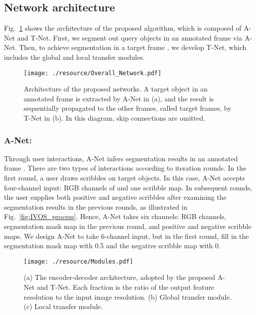 \documentclass[runningheads]{llncs}
\begin{document}
\subsection{Network architecture} \label{subsec:Network}

Fig.~\ref{fig:OverallNetwork} shows the architecture of the proposed algorithm, which is composed of A-Net and T-Net. First, we segment out query objects in an annotated frame  via A-Net. Then, to achieve segmentation in a target frame , we develop T-Net, which includes the global and local transfer modules.

\begin{figure}[t]
\centering
    \texttt{[image: ./resource/Overall\_Network.pdf]}
\caption{Architecture of the proposed networks. A target object in an annotated frame  is extracted by A-Net in (a), and the result is sequentially propagated to the other frames, called target frames, by T-Net in (b). In this diagram, skip connections are omitted.}
\label{fig:OverallNetwork}
\end{figure}

\subsubsection{A-Net:} \label{subsubsec:UANet}

Through user interactions, A-Net infers segmentation results in an annotated frame . There are two types of interactions according to iteration rounds. In the first round, a user draws scribbles on target objects. In this case, A-Net accepts four-channel input: RGB channels of  and one scribble map. In subsequent rounds, the user supplies both positive and negative scribbles after examining the segmentation results in the previous rounds, as illustrated in Fig.~\ref{fig:IVOS_process}. Hence, A-Net takes six channels: RGB channels, segmentation mask map in the previous round, and positive and negative scribble maps. We design A-Net to take 6-channel input, but in the first round, fill in the segmentation mask map with 0.5 and the negative scribble map with 0.

\begin{figure}[h]
\centering
    \texttt{[image: ./resource/Modules.pdf]}
    \caption{(a) The encoder-decoder architecture, adopted by the proposed A-Net and T-Net. Each fraction is the ratio of the output feature resolution to the input image resolution. (b) Global transfer module. (c) Local transfer module.}
    \label{fig:EncDec}
\end{figure}
\end{document}
